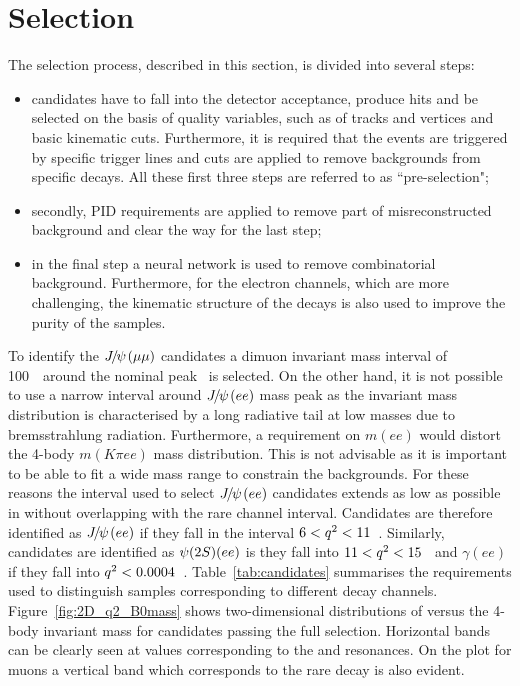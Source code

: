 
\section{Selection}
\label{sec:RKst_selection}

The selection process, described in this section, is divided into several steps:
\begin{itemize}
\item candidates have to fall into the detector acceptance, produce hits and be selected
on the basis of quality variables, such as \chisq of tracks and vertices and basic kinematic cuts.
Furthermore, it is required that the events are triggered by specific
trigger lines and cuts are applied to remove backgrounds from specific decays.
All these first three steps are referred to as ``pre-selection";
\item secondly, PID requirements are applied to remove part of misreconstructed
background and clear the way for the last step;
\item in the final step a neural network is used to remove combinatorial background. Furthermore,
for the electron channels, which are more challenging, the kinematic structure of the decays
is also used to improve the purity of the samples.
\end{itemize}
%
To identify the $\jpsi(\mu\mu)$ candidates a dimuon invariant mass
interval of 100~\mevcc~around the nominal \jpsi peak~\cite{PDG2014} is selected.
On the other hand, it is not possible to use a narrow interval around $\jpsi(ee)$ mass peak as the invariant mass
distribution is characterised by a long radiative tail at low masses due to bremsstrahlung radiation.
Furthermore, a requirement on $m(ee)$ would distort the 4-body $m(K\pi ee)$ mass distribution. This is not advisable 
as it is important to be able to fit a wide mass range to constrain the backgrounds. For these reasons the interval used to 
select $\jpsi(ee)$ candidates extends as low as possible in \qsq without overlapping with
the rare channel interval. Candidates are therefore identified as $\jpsi(ee)$ if they fall in the \qsq interval
$6 < {q^2} < 11$~\gevgevcccc. Similarly, candidates are identified as $\psitwos(ee)$ is they fall into $11 < {q^2} < 15$~\gevgevcccc
and $\gamma(ee)$ if they fall into ${q^2} < 0.0004$~\gevgevcccc.
Table~\ref{tab:candidates} summarises the requirements used to distinguish samples corresponding to different decay channels.
Figure~\ref{fig:2D_q2_B0mass} shows two-dimensional distributions of \qsq versus the 4-body invariant mass 
for candidates passing the full selection. Horizontal bands can be clearly seen at \qsq values corresponding to the \jpsi and \psitwos resonances.
On the plot for muons a vertical band which corresponds to the rare decay is also evident.

